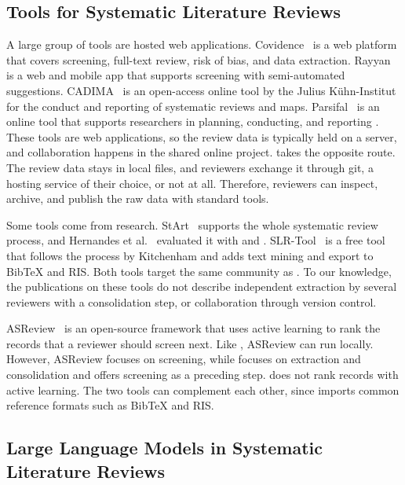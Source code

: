 \subsection{Tools for Systematic Literature Reviews}\label{sec:related-work-tools}

A large group of tools are hosted web applications.
Covidence~\cite{covidence} is a web platform that covers screening, full-text review, risk of bias, and data extraction.
Rayyan~\cite{ouzzani2016rayyan} is a web and mobile app that supports screening with semi-automated suggestions.
CADIMA~\cite{kohl2018cadima} is an open-access online tool by the Julius K\"uhn-Institut for the conduct and reporting of systematic reviews and maps.
Parsifal~\cite{parsifal} is an online tool that supports researchers in planning, conducting, and reporting \SLRs.
These tools are web applications, so the review data is typically held on a server, and collaboration happens in the shared online project.
\SaiLoR takes the opposite route.
The review data stays in local files, and reviewers exchange it through git, a hosting service of their choice, or not at all.
Therefore, reviewers can inspect, archive, and publish the raw data with standard tools.

Some tools come from \SE research.
StArt~\cite{hernandes2012start,fabbri2016start} supports the whole systematic review process, and Hernandes et al.~\cite{hernandes2012start} evaluated it with \GQM and \TAM.
SLR-Tool~\cite{fernandezsaez2010slrtool} is a free tool that follows the process by Kitchenham and adds text mining and export to BibTeX and RIS.
Both tools target the same community as \SaiLoR.
To our knowledge, the publications on these tools do not describe independent extraction by several reviewers with a consolidation step, or collaboration through version control.

ASReview~\cite{vandeschoot2021asreview} is an open-source framework that uses active learning to rank the records that a reviewer should screen next.
Like \SaiLoR, ASReview can run locally.
However, ASReview focuses on screening, while \SaiLoR focuses on extraction and consolidation and offers screening as a preceding step.
\SaiLoR does not rank records with active learning.
The two tools can complement each other, since \SaiLoR imports common reference formats such as BibTeX and RIS.

\subsection{Large Language Models in Systematic Literature Reviews}\label{sec:related-work-llm}

